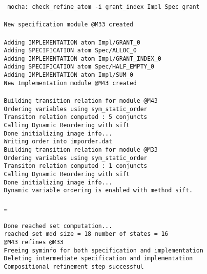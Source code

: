 \mypar
\noindent
{\tt
mocha: check\_refine\_atom  -i {grant\_index} Impl Spec grant \\
\\
New specification module @M33 created \\
\\
Adding IMPLEMENTATION atom Impl/GRANT\_0 \\
Adding SPECIFICATION  atom Spec/ALLOC\_0 \\
Adding IMPLEMENTATION atom Impl/GRANT\_INDEX\_0 \\
Adding SPECIFICATION  atom Spec/HALF\_EMPTY\_0 \\
Adding IMPLEMENTATION atom Impl/SUM\_0 \\
New Implementation module @M43 created \\
\\
Building transition relation for module @M43 \\
Ordering variables using sym\_static\_order \\
Transiton relation computed : 5 conjuncts \\
Calling Dynamic Reordering with sift \\
Done initializing image info... \\
Writing order into imporder.dat \\
Building transition relation for module @M33 \\
Ordering variables using sym\_static\_order \\
Transiton relation computed : 1 conjuncts \\
Calling Dynamic Reordering with sift \\
Done initializing image info... \\
Dynamic variable ordering is enabled with method sift. \\
\\
\ldots\\
\\
Done reached set computation... \\
reached set mdd size =         18        number of states =       16 \\
@M43 refines @M33 \\
Freeing syminfo for both specification and implementation \\
Deleting intermediate specification and implementation \\
Compositional refinement step successful \\
}
